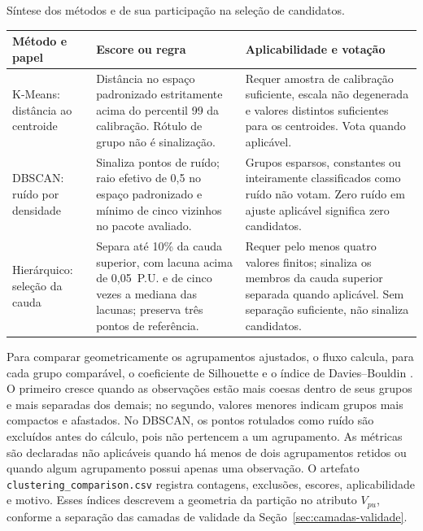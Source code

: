 \documentclass[
	12pt,				%
	openright,			%
	oneside,			%
	a4paper,			%
	chapter=TITLE,		%
	section=TITLE,		%
	subsection=TITLE,	%
	subsubsection=TITLE,%
	english,			%
	brazilian			%
	]{abntex2}
\theoremstyle{definition}
\begin{document}
\begin{quadro}[htbp]
\centering
\caption{Síntese dos métodos e de sua participação na seleção de candidatos.}
\label{qua:criterios-metodos}
\small
\renewcommand{\arraystretch}{1.15}
\begin{tabularx}{\textwidth}
    {|>{\RaggedRight\arraybackslash}p{2cm}|L|L|}
\hline
\textbf{Método e papel} & \textbf{Escore ou regra} &
\textbf{Aplicabilidade e votação} \\
\hline
K-Means: distância ao centroide &
Distância no espaço padronizado estritamente acima do percentil 99 da
calibração. Rótulo de grupo não é sinalização. &
Requer amostra de calibração suficiente, escala não degenerada e valores
distintos suficientes para os centroides. Vota quando aplicável. \\
\hline
DBSCAN: ruído por densidade &
Sinaliza pontos de ruído; raio efetivo de 0,5 no espaço padronizado e
mínimo de cinco vizinhos no pacote avaliado. &
Grupos esparsos, constantes ou inteiramente classificados como ruído não
votam. Zero ruído em ajuste aplicável significa zero candidatos. \\
\hline
Hierárquico: seleção da cauda &
Separa até 10\% da cauda superior, com lacuna acima de 0,05~P.U. e de cinco
vezes a mediana das lacunas; preserva três pontos de referência. &
Requer pelo menos quatro valores finitos; sinaliza os membros da cauda
superior separada quando aplicável.
Sem separação suficiente, não sinaliza candidatos. \\
\hline
\end{tabularx}
\end{quadro}

Para comparar geometricamente os agrupamentos ajustados, o fluxo
calcula, para cada grupo comparável, o coeficiente de Silhouette e o índice
de Davies--Bouldin \cite{rousseeuw1987,davies1979}. O primeiro cresce quando as observações estão mais
coesas dentro de seus grupos e mais separadas dos demais; no segundo, valores
menores indicam grupos mais compactos e afastados. No DBSCAN, os pontos
rotulados como ruído são excluídos antes do cálculo, pois não pertencem a um
agrupamento. As métricas são declaradas não aplicáveis quando há menos de dois
agrupamentos retidos ou quando algum agrupamento possui apenas uma observação. O
artefato \texttt{clustering\_comparison.csv} registra contagens, exclusões,
escores, aplicabilidade e motivo. Esses índices descrevem a geometria da
partição no atributo $V_{pu}$, conforme a separação das camadas de validade
da Seção~\ref{sec:camadas-validade}.
\end{document}

